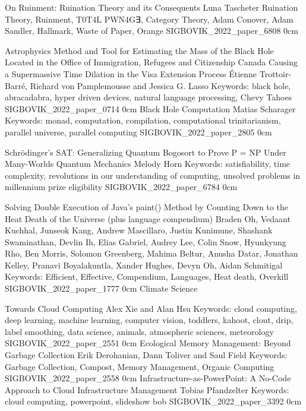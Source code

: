 \addpaper
    {On Ruinment: Ruination Theory and its Consequents}
    {Luna Tascheter}
    {Ruination Theory, Ruinment, T0T4L PWN4G∃, Category Theory, Adam Conover, Adam Sandler, Hallmark, Waste of Paper, Orange}
    {SIGBOVIK_2022_paper_6808}
    {0cm}
    {}

\addtrack
    {}{Astrophysics}
\addpaper
    {Method and Tool for Estimating the Mass of the Black Hole Located in the Office of Immigration, Refugees and Citizenship Canada Causing a Supermassive Time Dilation in the Visa Extension Process}
    {Étienne Trottoir-Barré, Richard von Pamplemousse and Jessica G. Lasso}
    {Keywords: black hole, abracadabra, hyper driven devices, natural language processing, Chevy Tahoes}
    {SIGBOVIK_2022_paper_0714}
    {0cm}
    {}
\addpaper
    {Black Hole Computation}
    {Matias Scharager}
    {Keywords: monad, computation, compilation, computational trinitarianism, parallel universe, parallel computing}
    {SIGBOVIK_2022_paper_2805}
    {0cm}
    {}

\addpaper
    {Schrödinger’s SAT: Generalizing Quantum Bogosort to Prove P = NP Under Many-Worlds Quantum Mechanics}
    {Melody Horn}
    {Keywords: satisfiability, time complexity, revolutions in our understanding of computing, unsolved problems in millennium prize eligibility}
    {SIGBOVIK_2022_paper_6784}
    {0cm}
    {}


\addpaper
    {Solving Double Execution of Java’s paint() Method by Counting Down to the Heat Death of the Universe (plus language compendium)}
    {Braden Oh, Vedaant Kuchhal, Junseok Kang, Andrew Mascillaro, Justin Kunimune, Shashank Swaminathan, Devlin Ih, Elias Gabriel, Audrey Lee, Colin Snow, Hyunkyung Rho, Ben Morris, Solomon Greenberg, Mahima Beltur, Anusha Datar, Jonathan Kelley, Pranavi Boyalakuntla, Xander Hughes, Devyn Oh, Aidan Schmitigal}
    {Keywords: Efficient, Effective, Compendium, Languages, Heat death, Overkill}
    {SIGBOVIK_2022_paper_1777}
    {0cm}
    {}
\addtrack
    {}{Climate Science}

\addpaper
    {Towards Cloud Computing}
    {Alex Xie and Alan Hsu}
    {Keywords: cloud computing, deep learning, machine learning, computer vision, toddlers, kahoot, clout, drip, label smoothing, data science, animals, atmospheric sciences, meteorology}
    {SIGBOVIK_2022_paper_2551}
    {0cm}
    {}
\addpaper
    {Ecological Memory Management: Beyond Garbage Collection}
    {Erik Derohanian, Dann Toliver and Saul Field}
    {Keywords: Garbage Collection, Compost, Memory Management, Organic Computing}
    {SIGBOVIK_2022_paper_2558}
    {0cm}
    {}
\addpaper
    {Infrastructure-as-PowerPoint: A No-Code Approach to Cloud Infrastructure Management}
    {Tobias Pfandzelter}
    {Keywords: cloud computing, powerpoint, slideshow bob}
    {SIGBOVIK_2022_paper_3392}
    {0cm}
    {}

